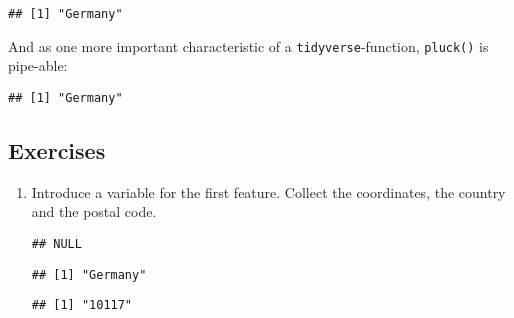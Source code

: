 \documentclass[]{book}
\newenvironment{Shaded}{\begin{snugshade}}{\end{snugshade}}
\newcommand{\DecValTok}[1]{\textcolor[rgb]{0.00,0.00,0.81}{#1}}
\newcommand{\KeywordTok}[1]{\textcolor[rgb]{0.13,0.29,0.53}{\textbf{#1}}}
\newcommand{\NormalTok}[1]{#1}
\newcommand{\OperatorTok}[1]{\textcolor[rgb]{0.81,0.36,0.00}{\textbf{#1}}}
\newcommand{\StringTok}[1]{\textcolor[rgb]{0.31,0.60,0.02}{#1}}
\begin{document}
\begin{verbatim}
## [1] "Germany"
\end{verbatim}

And as one more important characteristic of a \texttt{tidyverse}-function, \texttt{pluck()} is pipe-able:

\begin{Shaded}
\end{Shaded}

\begin{verbatim}
## [1] "Germany"
\end{verbatim}

\hypertarget{exercises-20}{%
\subsection{Exercises}\label{exercises-20}}

\begin{enumerate}
\def\labelenumi{\arabic{enumi}.}
\item
  Introduce a variable for the first feature. Collect the coordinates, the country and the postal code.

\begin{Shaded}
\end{Shaded}

\begin{verbatim}
## NULL
\end{verbatim}

\begin{verbatim}
## [1] "Germany"
\end{verbatim}

\begin{verbatim}
## [1] "10117"
\end{verbatim}
\end{enumerate}
\end{document}
